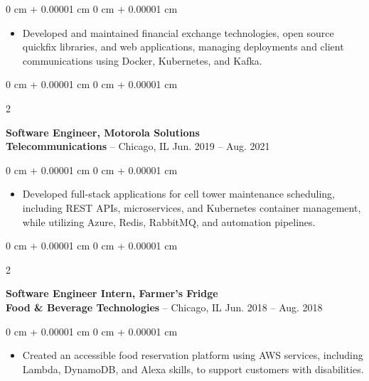 \documentclass[10pt, letterpaper]{article}
\newenvironment{highlights}{
    \begin{itemize}[
        topsep=0.10 cm,
        parsep=0.10 cm,
        partopsep=0pt,
        itemsep=0pt,
        leftmargin=0 cm + 10pt
    ]
}{
    \end{itemize}
} %
\newenvironment{onecolentry}{
    \begin{adjustwidth}{
        0 cm + 0.00001 cm
    }{
        0 cm + 0.00001 cm
    }
}{
    \end{adjustwidth}
} %
\newenvironment{twocolentry}[2][]{
    \onecolentry
    \def\secondColumn{#2}
    \setcolumnwidth{\fill, 5 cm}
    \begin{paracol}{2}
}{
    \switchcolumn \raggedleft \secondColumn
    \end{paracol}
    \endonecolentry
} %
\begin{document}
        \vspace{0.10 cm}
        \begin{onecolentry}
            \begin{highlights}
                \item Developed and maintained financial exchange technologies, open source quickfix libraries, and web applications, managing deployments and client communications using Docker, Kubernetes, and Kafka.
            \end{highlights}
        \end{onecolentry}


        \vspace{0.2 cm}

        \begin{twocolentry}{
            Jun. 2019 – Aug. 2021
        }
            \textbf{Software Engineer, Motorola Solutions\\
            Telecommunications} -- Chicago, IL\end{twocolentry}

        \vspace{0.10 cm}
        \begin{onecolentry}
            \begin{highlights}
                \item Developed full-stack applications for cell tower maintenance scheduling, including REST APIs, microservices, and Kubernetes container management, while utilizing Azure, Redis, RabbitMQ, and automation pipelines.
            \end{highlights}
        \end{onecolentry}


        \vspace{0.2 cm}

        \begin{twocolentry}{
            Jun. 2018 – Aug. 2018
        }
            \textbf{Software Engineer Intern, Farmer's Fridge\\
            Food \& Beverage Technologies} -- Chicago, IL\end{twocolentry}

        \vspace{0.10 cm}
        \begin{onecolentry}
            \begin{highlights}
                \item Created an accessible food reservation platform using AWS services, including Lambda, DynamoDB, and Alexa skills, to support customers with disabilities.
            \end{highlights}
        \end{onecolentry}
\end{document}
